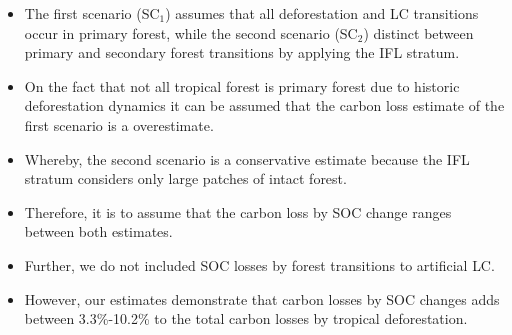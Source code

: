 \begin{itemize}
			\item The first scenario (SC$_1$) assumes that all deforestation and \ac{LC} transitions occur in primary forest, while the second scenario (SC$_2$) distinct between primary and secondary forest transitions by applying the \ac{IFL} stratum.
			\item On the fact that not all tropical forest is primary forest due to historic deforestation dynamics it can be assumed that the carbon loss estimate of the first scenario is a overestimate.
			\item Whereby, the second scenario is a conservative estimate because the \ac{IFL} stratum considers only large patches of intact forest.
			\item Therefore, it is to assume that the carbon loss by \ac{SOC} change ranges between both estimates.
			\item Further, we do not included \ac{SOC} losses by forest transitions to artificial \ac{LC}.
			\item However, our estimates demonstrate that carbon losses by \ac{SOC} changes adds between 3.3\%-10.2\% to the total carbon losses by tropical deforestation.
	\end{itemize}

